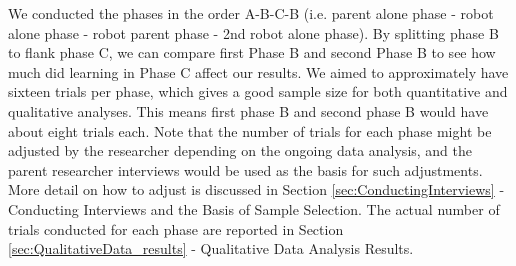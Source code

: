 We conducted the phases in the order A-B-C-B (i.e. parent alone phase - robot alone phase - robot parent phase - 2nd robot alone phase).  By splitting phase B to flank phase C, we can compare first Phase B and second Phase B to see how much did learning in Phase C affect our results.  We aimed to approximately have sixteen trials per phase, which gives a good sample size for both quantitative and qualitative analyses.  This means first phase B and second phase B would have about eight trials each.  Note that the number of trials for each phase might be adjusted by the researcher depending on the ongoing data analysis, and the parent researcher interviews would be used as the basis for such adjustments.  More detail on how to adjust is discussed in Section \ref{sec:ConductingInterviews} - Conducting Interviews and the Basis of Sample Selection.  The actual number of trials conducted for each phase are reported in Section \ref{sec:QualitativeData_results} - Qualitative Data Analysis Results.


